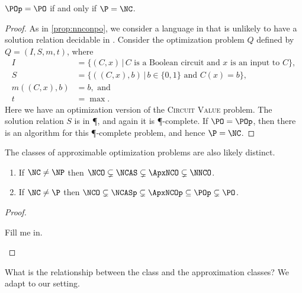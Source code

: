 \documentclass[]{article}
\begin{document}
\begin{proposition}
  $\POp = \PO$ if and only if $\P = \NC$.
\end{proposition}
\begin{proof}
  As in \autoref{prop:nnconpo}, we consider a language in \PO{} that is unlikely to have a solution relation decidable in \NC{}.
  Consider the optimization problem $Q$ defined by $Q = (I, S, m, t)$, where
  \begin{align*}
    I & = \{ (C, x) \, | \, C \text{ is a Boolean circuit and } x \text{ is an input to } C \}, \\
    S & = \{ ((C, x), b) \, | \, b \in \{0, 1\} \text{ and } C(x) = b \}, \\
    m((C, x), b) & = b, \text{ and} \\
    t & = \max.
  \end{align*}
  Here we have an optimization version of the \textsc{Circuit Value} problem.
  The solution relation $S$ is in \P, and again it is \P-complete.
  If $\PO = \POp$, then there is an \NC{} algorithm for this \P-complete problem, and hence $\P = \NC$.
\end{proof}

The classes of approximable optimization problems are also likely distinct.

\begin{theorem}
  \mbox{}
  \begin{enumerate}
  \item If $\NC \neq \NP$ then $\NCO \subsetneq \NCAS \subsetneq \ApxNCO \subsetneq \NNCO$.
  \item If $\NC \neq \P$ then $\NCO \subsetneq \NCASp \subsetneq \ApxNCOp \subseteq \POp \subsetneq \PO$.
  \end{enumerate}
\end{theorem}
\begin{proof}
  \begin{todo}
    Fill me in.
  \end{todo}
\end{proof}

What is the relationship between the class \POp{} and the \NC{} approximation classes?
We adapt \cite[Theorem~8.2.9]{dsst97} to our setting.
\end{document}
